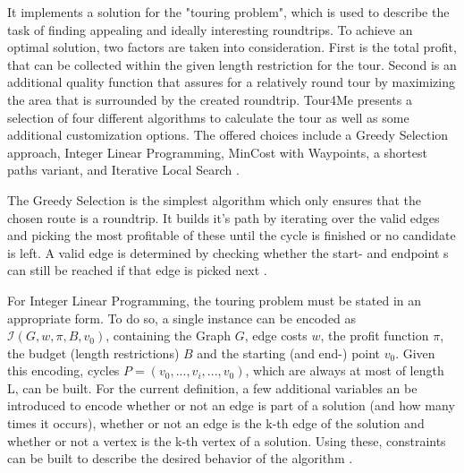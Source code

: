 
It implements a solution for the "touring problem", which is used to describe the task of finding appealing and ideally interesting roundtrips.
To achieve an optimal solution, two factors are taken into consideration.
First is the total profit, that can be collected within the given length restriction for the tour.
Second is an additional quality function that assures for a relatively round tour by maximizing the area that is surrounded by the created roundtrip.
Tour4Me presents a selection of four different algorithms to calculate the tour as well as some additional customization options.
The offered choices include a Greedy Selection approach, Integer Linear Programming, MinCost with Waypoints, a shortest paths variant, and Iterative Local Search \cite{buchin_tour4me_2022}. 

The Greedy Selection is the simplest algorithm which only ensures that the chosen route is a roundtrip.
It builds it's path by iterating over the valid edges and picking the most profitable of these until the cycle is finished or no candidate is left.
A valid edge is determined by checking whether the start- and endpoint s can still be reached if that edge is picked next \cite{buchin_tour4me_2022}.


For Integer Linear Programming, the touring problem must be stated in an appropriate form.
To do so, a single instance can be encoded as $\mathcal{I}(G, w, \pi, B, v_0)$, containing the Graph $G$, edge costs $w$, the profit function $\pi$, the budget (length restrictions) $B$ and the starting (and end-) point $v_0$.
Given this encoding, cycles $P=(v_0,...,v_i,...,v_0)$, which are always at most of length L, can be built.
For the current definition, a few additional variables an be introduced to encode whether or not an edge is part of a solution (and how many times it occurs), whether or not an edge is the k-th edge of the solution and whether or not a vertex is the k-th vertex of a solution. 
Using these, constraints can be built to describe the desired behavior of the algorithm \cite{buchin_tour4me_2022}.


